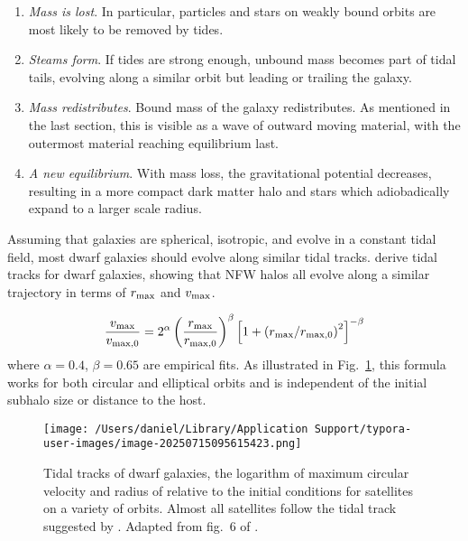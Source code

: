 \begin{enumerate}
\def\labelenumi{\arabic{enumi}.}
\tightlist
\item
  \emph{Mass is lost}. In particular, particles and stars on weakly
  bound orbits are most likely to be removed by tides.
\item
  \emph{Steams form}. If tides are strong enough, unbound mass becomes
  part of tidal tails, evolving along a similar orbit but leading or
  trailing the galaxy.
\item
  \emph{Mass redistributes}. Bound mass of the galaxy redistributes. As
  mentioned in the last section, this is visible as a wave of outward
  moving material, with the outermost material reaching equilibrium
  last.
\item
  \emph{A new equilibrium}. With mass loss, the gravitational potential
  decreases, resulting in a more compact dark matter halo and stars
  which adiobadically expand to a larger scale radius.
\end{enumerate}

Assuming that galaxies are spherical, isotropic, and evolve in a
constant tidal field, most dwarf galaxies should evolve along similar
tidal tracks. \citet{EN2021} derive tidal tracks for dwarf galaxies,
showing that NFW halos all evolve along a similar trajectory in terms of
\(r_{\rm max}\) and \(v_{\rm max}\).

\begin{equation}{
\frac{v_{\rm max}}{v_{\rm max, 0}} = 
2^\alpha 
\left(\frac{r_{\rm max}}{r_{\rm max, 0}}\right)^{\beta}\left[1 + \left(r_{\rm max} / r_{\rm max, 0}\right)^2\right]^{-\beta}
}\end{equation} where \(\alpha=0.4\), \(\beta=0.65\) are empirical fits.
As illustrated in Fig.~\ref{fig:tidal_tracks}, this formula works for
both circular and elliptical orbits and is independent of the initial
subhalo size or distance to the host.

\begin{figure}
\centering
\texttt{[image: /Users/daniel/Library/Application Support/typora-user-images/image-20250715095615423.png]}
\caption[Tidal tracks of dwarf galaxies]{Tidal tracks of dwarf galaxies,
the logarithm of maximum circular velocity and radius of relative to the
initial conditions for satellites on a variety of orbits. Almost all
satellites follow the tidal track suggested by \citet{EN2021}. Adapted
from fig.~6 of \citet{EN2021}.}\label{fig:tidal_tracks}
\end{figure}

